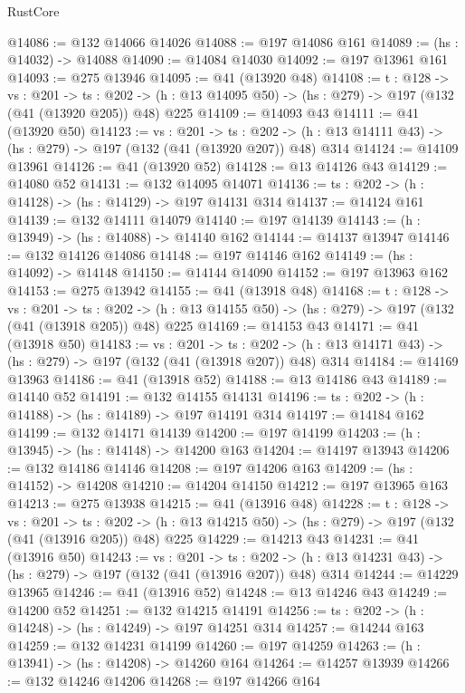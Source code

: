 \begin{lexlean}{RustCore}
\begin{coremodule}
@14086 := @132 @14066 @14026
@14088 := @197 @14086 @161
@14089 := (hs : @14032) -> @14088
@14090 := @14084 @14030
@14092 := @197 @13961 @161
@14093 := @275 @13946
@14095 := @41 (@13920 @48)
@14108 := {t : @128} ->
  {vs : @201} ->
  {ts : @202} -> (h : @13 @14095 @50) -> (hs : @279) -> @197 (@132 (@41 (@13920 @205)) @48) @225
@14109 := @14093 @43
@14111 := @41 (@13920 @50)
@14123 := {vs : @201} ->
  {ts : @202} -> (h : @13 @14111 @43) -> (hs : @279) -> @197 (@132 (@41 (@13920 @207)) @48) @314
@14124 := @14109 @13961
@14126 := @41 (@13920 @52)
@14128 := @13 @14126 @43
@14129 := @14080 @52
@14131 := @132 @14095 @14071
@14136 := {ts : @202} -> (h : @14128) -> (hs : @14129) -> @197 @14131 @314
@14137 := @14124 @161
@14139 := @132 @14111 @14079
@14140 := @197 @14139
@14143 := (h : @13949) -> (hs : @14088) -> @14140 @162
@14144 := @14137 @13947
@14146 := @132 @14126 @14086
@14148 := @197 @14146 @162
@14149 := (hs : @14092) -> @14148
@14150 := @14144 @14090
@14152 := @197 @13963 @162
@14153 := @275 @13942
@14155 := @41 (@13918 @48)
@14168 := {t : @128} ->
  {vs : @201} ->
  {ts : @202} -> (h : @13 @14155 @50) -> (hs : @279) -> @197 (@132 (@41 (@13918 @205)) @48) @225
@14169 := @14153 @43
@14171 := @41 (@13918 @50)
@14183 := {vs : @201} ->
  {ts : @202} -> (h : @13 @14171 @43) -> (hs : @279) -> @197 (@132 (@41 (@13918 @207)) @48) @314
@14184 := @14169 @13963
@14186 := @41 (@13918 @52)
@14188 := @13 @14186 @43
@14189 := @14140 @52
@14191 := @132 @14155 @14131
@14196 := {ts : @202} -> (h : @14188) -> (hs : @14189) -> @197 @14191 @314
@14197 := @14184 @162
@14199 := @132 @14171 @14139
@14200 := @197 @14199
@14203 := (h : @13945) -> (hs : @14148) -> @14200 @163
@14204 := @14197 @13943
@14206 := @132 @14186 @14146
@14208 := @197 @14206 @163
@14209 := (hs : @14152) -> @14208
@14210 := @14204 @14150
@14212 := @197 @13965 @163
@14213 := @275 @13938
@14215 := @41 (@13916 @48)
@14228 := {t : @128} ->
  {vs : @201} ->
  {ts : @202} -> (h : @13 @14215 @50) -> (hs : @279) -> @197 (@132 (@41 (@13916 @205)) @48) @225
@14229 := @14213 @43
@14231 := @41 (@13916 @50)
@14243 := {vs : @201} ->
  {ts : @202} -> (h : @13 @14231 @43) -> (hs : @279) -> @197 (@132 (@41 (@13916 @207)) @48) @314
@14244 := @14229 @13965
@14246 := @41 (@13916 @52)
@14248 := @13 @14246 @43
@14249 := @14200 @52
@14251 := @132 @14215 @14191
@14256 := {ts : @202} -> (h : @14248) -> (hs : @14249) -> @197 @14251 @314
@14257 := @14244 @163
@14259 := @132 @14231 @14199
@14260 := @197 @14259
@14263 := (h : @13941) -> (hs : @14208) -> @14260 @164
@14264 := @14257 @13939
@14266 := @132 @14246 @14206
@14268 := @197 @14266 @164

\end{coremodule}
\end{lexlean}
